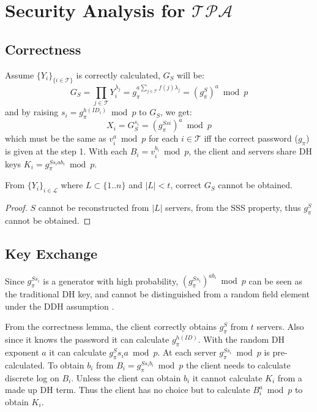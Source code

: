 \section{Security Analysis for $\mathcal{TPA}$}
\label{tpa}
\subsection{Correctness}
Assume $\{Y_i\}_{\{i \in \mathcal{T}\}}$ is correctly calculated,
$G_S$ will be:
\[
  G_S = \prod_{j \in \mathcal{T}}Y_i^{\lambda_j} = g_{\pi}^{a \sum_{j
      \in \mathcal{T}} f(j) \lambda_j} = (g_{\pi}^S)^a \bmod p
\]
and by raising $s_i = g_{\pi}^{h(ID_i)} \bmod p$ to $G_S$, we get:
\[
  X_i = G_S^{s_i} = (g_{\pi}^{Ssi})^a \bmod p
\]
which must be the same as $v_i^a \bmod p$ for each $i \in
\mathcal{T}$ iff the correct password ($g_{\pi}$) is given at the
step 1. With each $B_i = v_i^{b_i} \bmod p$, the client and servers
share DH keys $K_i = g_{\pi}^{Ss_iab_i} \bmod p$.

\begin{lemma}
\label{tpa1}
From $\{Y_i\}_{i \in \mathcal{L}}$ where $L \subset \{1..n\}$ and $|L| <
t$, correct $G_S$ cannot be obtained.
\end{lemma}

\begin{proof}
$S$ cannot be reconstructed from $|L|$ servers, from the SSS
  property, thus $g_{\pi}^S$ cannot be obtained.
\end{proof}

\subsection{Key Exchange}
Since $g_{\pi}^{Ss_i}$ is a generator with high probability,
$(g_{\pi}^{Ss_i})^{ab_i} \bmod p$ can be seen as the traditional DH
key, and cannot be distinguished from a random field element under the
DDH assumption \cite{boneh}.

From the correctness lemma, the client correctly obtains
$g_{\pi}^S$ from $t$ servers. Also since it knows the password it can
calculate $g_{\pi}^{h(ID)}$. With the random DH exponent $a$ it can
calculate $g_{\pi}^Ss_ia \bmod p$. At each server $g_{\pi}^{Ss_i}
\bmod p$ is pre-calculated. To obtain $b_i$ from $B_i =
g_{\pi}^{Ss_ib_i} \bmod p$ the client needs to calculate discrete log
on $B_i$. Unless the client can obtain $b_i$ it cannot calculate $K_i$
from a made up DH term. Thus the client has no choice but to calculate
$B_i^a \bmod p$ to obtain $K_i$.

